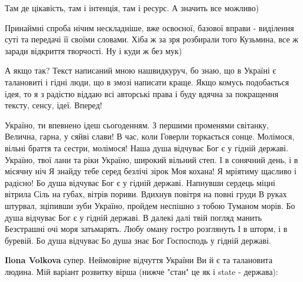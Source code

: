 \begin{itemize}
\begin{itemize}
Там де цікавість, там і інтенція, там і ресурс. А значить все можливо)

Принаймні спроба нічим нескладніше, вже освоєної, базової вправи - виділення
суті та передачі її своїми словами. Хіба ж за зря розбирали того Кузьмина, все
ж заради відкриття творчості. Ну і куди ж без мук)

\end{itemize}

 

А якщо так? Текст написаний мною нашвидкуруч, бо знаю, що в Україні є
талановиті і гідні люди, що в змозі написати краще. Якщо комусь подобається
ідея, то я з радістю віддаю всі авторські права і буду вдячна за покращення
тексту, сенсу, ідеї. Вперед!

\begin{multicols}{2}
\obeycr
Україно, ти впевнено ідеш сьогоденням.
З першими променями світанку,
Велична, гарна, у сяйві слави!
В час, коли Говерли торкається сонце.
Молімося, вільні браття та сестри, молімося!
Наша душа відчуває
Бог є у гідній державі.
Україно, твої лани та ріки
Україно, широкий вільний степ.
І в сонячний день, і в місячну ніч
Я знайду тебе серед безлічі зірок
Моя кохана!
Я мріятиму щасливо і радісно!
Бо душа відчуває
Бог є у гідній державі.
Напнувши сердець міцні вітрила
Сіль на губах, вітрів пориви.
Вдихнув повітря на повні груди
В руках штурвал, зціпивши зуби
Україно, пройдем неспішно з тобою
Туманом морів.
Бо душа відчуває
Бог є у гідній державі.
В далекі далі твій погляд манить
Безстрашні очі моря затьмарять.
Любу оману гостро розглянуть
І в шторм, і в буревій.
Бо душа відчуває
Бо душа знає
Бог Госпосподь у гідній державі.
\restorecr
\end{multicols}

\begin{itemize}
 
\textbf{Ilona Volkova} супер. Неймовірне відчуття України
Ви й є та талановита людина.
Мій варіант розвитку вірша (нижче "стан" це як і state - держава):


\end{itemize}
\end{itemize}
